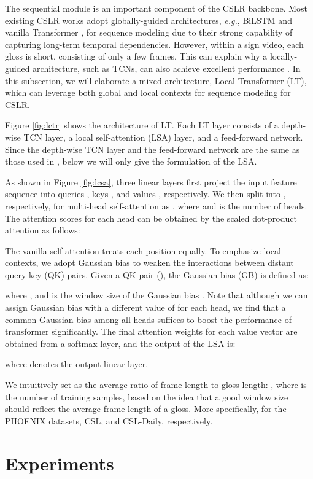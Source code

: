 \documentclass[acmsmall,screen]{acmart}
\def\eg{\emph{e.g.}} \def\Eg{\emph{E.g.}}
\begin{document}
The sequential module is an important component of the CSLR backbone.
Most existing CSLR works adopt globally-guided architectures, \eg, BiLSTM \cite{iopt, cma} and vanilla Transformer \cite{sfl, slt}, for sequence modeling due to their strong capability of capturing long-term temporal dependencies. 
However, within a sign video, each gloss is short, consisting of only a few frames.
This can explain why a locally-guided architecture, such as TCNs, can also achieve excellent performance \cite{fcn}.
In this subsection, we will elaborate a mixed architecture, Local Transformer (LT), which can leverage both global and local contexts for sequence modeling for CSLR.

Figure \ref{fig:lctr} shows the architecture of LT. 
Each LT layer consists of a depth-wise TCN layer, a local self-attention (LSA) layer, and a feed-forward network. 
Since the depth-wise TCN layer and the feed-forward network are the same as those used in \cite{qanet, transformer}, below we will only give the formulation of the LSA.

As shown in Figure \ref{fig:lcsa}, three linear layers first project the input feature sequence  into queries , keys , and values , respectively.
We then split  into , respectively, for multi-head self-attention as \cite{transformer}, where  and  is the number of heads.
The attention scores for each head can be obtained by the scaled dot-product attention as follows:


The vanilla self-attention treats each position equally. 
To emphasize local contexts, we adopt Gaussian bias \cite{gau-1, gau-2} to weaken the interactions between distant query-key (QK) pairs.
Given a QK pair (), the Gaussian bias (GB) is defined as:

where , and  is the window size of the Gaussian bias \cite{gau-1}.
Note that although we can assign Gaussian bias with a different value of  for each head, we find that a common Gaussian bias among all heads suffices to boost the performance of transformer significantly.
The final attention weights for each value vector are obtained from a softmax layer, and the output of the LSA is:

where  denotes the output linear layer.

We intuitively set  as the average ratio of frame length to gloss length: ,
where  is the number of training samples, based on the idea that a good window size should reflect the average frame length of a gloss.
More specifically,  for the PHOENIX datasets, CSL, and CSL-Daily, respectively.
 \section{Experiments}
\end{document}
